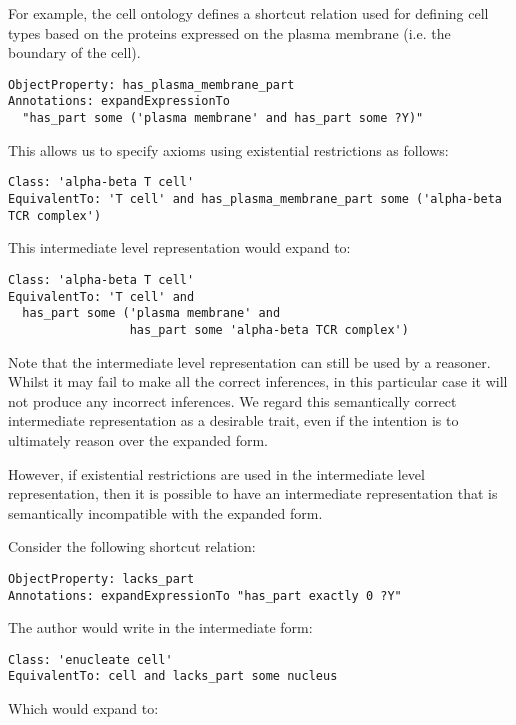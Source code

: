 \documentclass{llncs}
\begin{document}
For example, the cell ontology defines a shortcut relation used for
defining cell types based on the proteins expressed on the plasma
membrane (i.e. the boundary of the cell)\cite{Masci2009}.

\begin{verbatim}
ObjectProperty: has_plasma_membrane_part
Annotations: expandExpressionTo 
  "has_part some ('plasma membrane' and has_part some ?Y)"
\end{verbatim}

This allows us to specify axioms using existential restrictions as follows:

\begin{verbatim}
Class: 'alpha-beta T cell'
EquivalentTo: 'T cell' and has_plasma_membrane_part some ('alpha-beta TCR complex')
\end{verbatim}

This intermediate level representation would expand to:

\begin{verbatim}
Class: 'alpha-beta T cell'
EquivalentTo: 'T cell' and 
  has_part some ('plasma membrane' and 
                 has_part some 'alpha-beta TCR complex')
\end{verbatim}

Note that the intermediate level representation can still be used by a
reasoner. Whilst it may fail to make all the correct inferences, in
this particular case it will not produce any incorrect inferences. We
regard this semantically correct intermediate representation as a
desirable trait, even if the intention is to ultimately reason over
the expanded form.

However, if existential restrictions are used in the intermediate
level representation, then it is possible to have an intermediate
representation that is semantically incompatible with the expanded
form.

Consider the following shortcut relation:

\begin{verbatim}
ObjectProperty: lacks_part
Annotations: expandExpressionTo "has_part exactly 0 ?Y"
\end{verbatim}

The author would write in the intermediate form:

\begin{verbatim}
Class: 'enucleate cell'
EquivalentTo: cell and lacks_part some nucleus
\end{verbatim}

Which would expand to:
\end{document}
